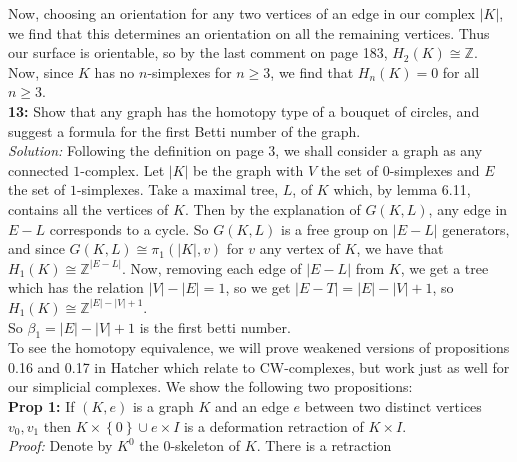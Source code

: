 \documentclass[a4paper]{article}
\begin{document}
    Now, choosing an orientation for any two vertices of an edge in our complex $\left| K \right|
    $, we find that this determines an orientation on all the remaining
    vertices. Thus our surface is orientable, so by the last comment on page
    183, $H_2 (K) \cong \mathbb{Z}$. Now, since $K$ has no  $n$-simplexes for
    $n\ge 3$, we find that $H_n (K) = 0$ for all $n\ge 3$.\\
    \linebreak
    \textbf{13:} Show that any graph has the homotopy type of a bouquet of
    circles, and suggest a formula for the first Betti number of the graph.\\
    \linebreak
    \textit{Solution:} Following the definition on page 3,
    we shall consider a graph as any connected
    $1$-complex. Let $\left| K \right| $ be the graph with
    $V$ the set of $0$-simplexes and 
    $E$ the set of $1$-simplexes. 
    Take a maximal tree, $L$, of $K$ which, by lemma 6.11,
    contains all the vertices of $K$. Then by the
    explanation of $G(K,L)$, any edge in
    $E - L$ corresponds to a cycle. So $G(K,L)$ is 
    a free group on $\left| E - L \right| $ generators, and
    since $G(K,L) \cong \pi_1
    \left( \left| K \right| ,v \right) $ for $v$ any vertex of
    $K$, we have that $H_1(K) \cong
    \mathbb{Z}^{\left| E-L \right| }$. Now,
    removing each edge of $\left| E-L \right| $ from
    $K$, we get a tree which has the relation
    $\left| V \right| - \left| E \right| = 1$, so
    we get $\left| E-T \right| 
    = \left| E \right| - \left| V \right| +1$, so
    $H_1(K) \cong \mathbb{Z}^{\left| E \right| - \left| V \right| +1}$.\\
    So $\beta_1 = \left| E \right| -\left| V \right| +1$ is the first betti
    number.\\
    \linebreak
    To see the homotopy equivalence, we will prove weakened versions
    of propositions
    0.16 and 0.17 in Hatcher which relate to CW-complexes, but work just as
      well for our simplicial complexes. We show the following two
      propositions:\\
    \textbf{Prop 1:} If $(K,e)$ is a graph $K$ and an edge
    $e$ between two distinct vertices $v_0, v_1$ then
    $K \times \left\{ 0 \right\} \cup e \times I$ is a deformation retraction
    of $K \times I$.\\
    \linebreak
    \textit{Proof:} Denote by
    $K^{0}$ the 0-skeleton of $K$. There is a retraction
\end{document}
